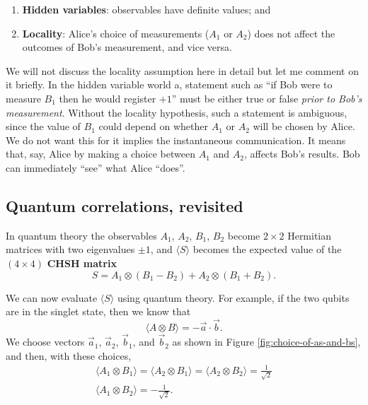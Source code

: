 \documentclass[fleqn]{article}
\providecommand{\tightlist}{%
  \setlength{\itemsep}{0pt}\setlength{\parskip}{0pt}}
\begin{document}
\begin{enumerate}
\def\labelenumi{\arabic{enumi}.}
\tightlist
\item
  \textbf{Hidden variables}: observables have definite values; and
\item
  \textbf{Locality}: Alice's choice of measurements (\(A_1\) or \(A_2\)) does not affect the outcomes of Bob's measurement, and vice versa.
\end{enumerate}

We will not discuss the locality assumption here in detail but let me comment on it briefly.
In the hidden variable world a, statement such as ``if Bob were to measure \(B_1\) then he would register \(+1\)'' must be either true or false \emph{prior to Bob's measurement}.
Without the locality hypothesis, such a statement is ambiguous, since the value of \(B_1\) could depend on whether \(A_1\) or \(A_2\) will be chosen by Alice.
We do not want this for it implies the instantaneous communication.
It means that, say, Alice by making a choice between \(A_1\) and \(A_2\), affects Bob's results.
Bob can immediately ``see'' what Alice ``does''.

\hypertarget{quantum-correlations-revisited}{%
\subsection{Quantum correlations, revisited}\label{quantum-correlations-revisited}}

In quantum theory the observables \(A_1\), \(A_2\), \(B_1\), \(B_2\) become \(2\times 2\) Hermitian matrices with two eigenvalues \(\pm 1\), and \(\langle S\rangle\) becomes the expected value of the \((4\times 4)\) \textbf{CHSH matrix}
\[
  S
  = A_1\otimes(B_1-B_2) + A_2\otimes(B_1+B_2).
\]

We can now evaluate \(\langle S\rangle\) using quantum theory.
For example, if the two qubits are in the singlet state, then we know that
\[
  \langle A\otimes B\rangle = -\vec{a}\cdot\vec{b}.
\]
We choose vectors \(\vec{a}_1\), \(\vec{a}_2\), \(\vec{b}_1\), and \(\vec{b}_2\) as shown in Figure \ref{fig:choice-of-as-and-bs}, and then, with these choices,
\[
\begin{gathered}
  \langle A_1\otimes B_1\rangle
  = \langle A_2\otimes B_1\rangle
  = \langle A_2\otimes B_2\rangle
  = \frac{1}{\sqrt 2}
\\\langle A_1\otimes B_2\rangle
   = -\frac{1}{\sqrt 2}.
\end{gathered}
\]
\end{document}
